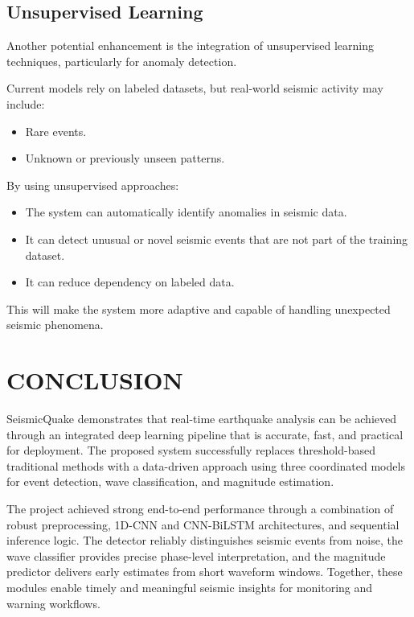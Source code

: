 \documentclass[a4paper,12pt]{report}
\begin{document}
\section{Unsupervised Learning}
\label{sec:5.4}

Another potential enhancement is the integration of unsupervised learning techniques, particularly for anomaly detection.

Current models rely on labeled datasets, but real-world seismic activity may include:
\begin{itemize}
\item Rare events.
\item Unknown or previously unseen patterns.
\end{itemize}

By using unsupervised approaches:
\begin{itemize}
\item The system can automatically identify anomalies in seismic data.
\item It can detect unusual or novel seismic events that are not part of the training dataset.
\item It can reduce dependency on labeled data.
\end{itemize}

This will make the system more adaptive and capable of handling unexpected seismic phenomena.

\chapter{CONCLUSION}
\label{chap:conclusion}

SeismicQuake demonstrates that real-time earthquake analysis can be achieved through an integrated deep learning pipeline that is accurate, fast, and practical for deployment. The proposed system successfully replaces threshold-based traditional methods with a data-driven approach using three coordinated models for event detection, wave classification, and magnitude estimation.

The project achieved strong end-to-end performance through a combination of robust preprocessing, 1D-CNN and CNN-BiLSTM architectures, and sequential inference logic. The detector reliably distinguishes seismic events from noise, the wave classifier provides precise phase-level interpretation, and the magnitude predictor delivers early estimates from short waveform windows. Together, these modules enable timely and meaningful seismic insights for monitoring and warning workflows.
\end{document}
